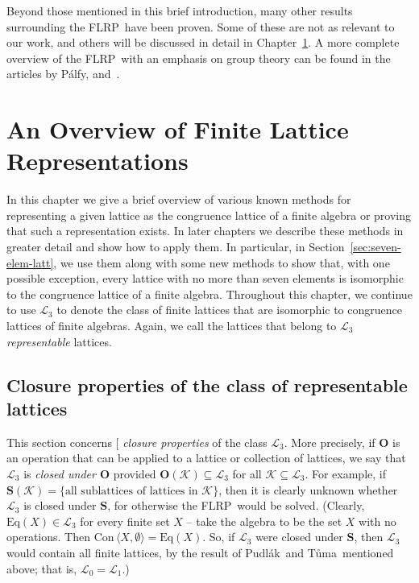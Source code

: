 \documentclass[cm,dissertation]{uhthesis}
\theoremstyle{plain}
\theoremstyle{definition}
\theoremstyle{remark}
\numberwithin{theorem}{section}
\numberwithin{claim}{chapter}
\numberwithin{equation}{section}
\numberwithin{conjecture}{chapter}
\newcommand{\indexTuma}{\index{T\r{u}ma, Ji\v{r}\'i}}
\newcommand{\Tuma}{T\r{u}ma}
\newcommand{\Palfy}{P\'alfy}
\newcommand{\Pudlak}{Pudl\'ak}
\newcommand{\<}{\ensuremath{\langle}}
\renewcommand{\>}{\ensuremath{\rangle}}
\newcommand{\Eq}{\ensuremath{\mathrm{Eq}}}
\newcommand{\Con}{\ensuremath{\mathrm{Con\,}}}
\newcommand{\FLRP}{{\small FLRP}}
\newcommand{\0}{\ensuremath{\mathbf{0}}}
\newcommand{\1}{\ensuremath{\mathbf{1}}}
\newcommand{\2}{\ensuremath{\mathbf{2}}}
\newcommand{\3}{\ensuremath{\mathbf{3}}}
\newcommand{\4}{\ensuremath{\mathbf{4}}}
\newcommand{\5}{\ensuremath{\mathbf{5}}}
\newcommand{\sK}{\ensuremath{\mathscr{K}}}
\newcommand{\sL}{\ensuremath{\mathscr{L}}}
\newcommand{\bO}{\ensuremath{\mathbf{O}}}
\newcommand{\bS}{\ensuremath{\mathbf{S}}}
\newcommand{\indexit}[1]{\index{#1|textit}}
\def\defn#1{\gdef\defnstring{#1}%
  \xdef\dodefnii{{\noexpand\em
       \defnstring}\noexpand\indexit{\defnstring}\noexpand\makeatother}%
  \futurelet\nextthing\dodefn}
\def\dodefn{%
  \ifx\nextthing[\let\next=\dodefni
    \else\let\next=\dodefnii\fi
  \makeatletter
  \next}
\def\dodefni[#1]{%
  {\em\defnstring}%
  \indexit{#1}%
  \makeatother}
\begin{document}
Beyond those mentioned in this brief introduction, many other results
surrounding the \FLRP\ have been proven.  Some of these are not as relevant to
our work, and others will be discussed in detail in
Chapter~\ref{cha:an-overview-finite}. A more complete overview of
the \FLRP\ with an emphasis on group theory can be found in the articles by
\Palfy, \cite{Palfy:1995} and~\cite{Palfy:2001}.  



\chapter{An Overview of Finite Lattice Representations}
\label{cha:an-overview-finite}
In this chapter we give a brief overview of various known methods for
representing a given lattice as the congruence lattice of a finite algebra or
proving that such a representation exists.
In later chapters we describe these methods in greater detail and show how to
apply them.  In particular, in Section~\ref{sec:seven-elem-latt}, we use them
along with some new methods to show that, with one possible exception, every
lattice with no more than seven elements is isomorphic to the congruence
lattice of a finite algebra. Throughout this chapter, we continue to use $\sL_3$
to denote the class of finite lattices that are isomorphic to congruence lattices of
finite algebras.  Again, we call the lattices that belong to $\sL_3$ \emph{representable}
lattices. 

\section{Closure properties of the class of representable lattices}
\label{sec:clos-prop-class}
This section concerns 
\defn{closure properties} 
of the class $\sL_3$. %
More precisely, if $\bO$ is an operation that can be applied to a lattice or
collection of lattices, we say that $\sL_3$ is \emph{closed under $\bO$} provided
$\bO(\sK) \subseteq \sL_3$ for all 
$\sK\subseteq \sL_3$. For example, if $\bS(\sK) = \{\text{all sublattices of
  lattices in $\sK$}\}$, then it is clearly unknown whether $\sL_3$ is closed under
$\bS$, for otherwise the \FLRP\ would be solved.
(Clearly, $\Eq(X)\in \sL_3$ for every finite set $X$ --
take the algebra to be the set $X$ with no operations. 
Then $\Con\<X, \emptyset\> = \Eq(X)$.  So, if $\sL_3$ were
closed under $\bS$, then $\sL_3$ would contain all finite lattices, by the
%
\indexTuma%
result of \Pudlak\ and \Tuma\ mentioned above; that is, $\sL_0=\sL_1$.) 
\end{document}
